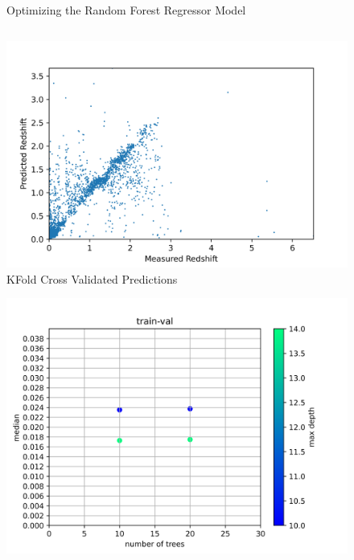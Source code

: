 \documentclass{beamer}
\begin{document}
\begin{frame}
\begin{columns}[onlytextwidth]
\begin{column}{.45\textwidth}
\begin{figure}
            \caption*{Optimizing the Random Forest Regressor Model}
        \end{figure}
    \end{column}
    \end{columns}
    \end{frame}

\begin{frame}
    \begin{figure}
        \includegraphics[scale=0.7]{img/RF-Result.png}
        \caption*{KFold Cross Validated Predictions}
    \end{figure}
    \end{frame}

\begin{frame}
    \begin{figure}
        \includegraphics[scale=0.65]{img/train-val.png}
    \end{figure}
    \end{frame}
\end{document}

